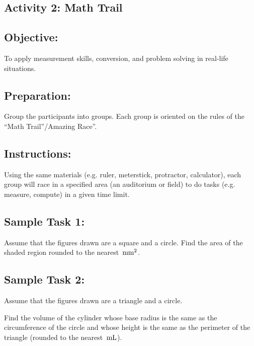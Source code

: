 \subsection*{Activity 2: Math Trail}
\subsection*{Objective:}
To apply measurement skills, conversion, and problem solving in real-life situations.
\subsection*{Preparation:}
Group the participants into groups. Each group is oriented on the rules of the “Math Trail”/Amazing Race”.
\subsection*{Instructions:}
Using the same materials (e.g. ruler, meterstick, protractor, calculator), each group will race
in a specified area (an auditorium or field) to do tasks (e.g. measure, compute) in a given
time limit.
\subsection*{Sample Task 1:}
Assume that the figures drawn are a square and a circle.
Find the area of the shaded region rounded to the nearest $\,\mathrm{mm}^2$.
\begin{figure}[!h]
\centering
{}
\end{figure}

\subsection*{Sample Task 2:}

Assume that the figures drawn are a triangle and a circle.

Find the volume of the cylinder whose base radius is the same as
the circumference of the circle and whose height is the same as the
perimeter of the triangle (rounded to the nearest $\,\mathrm{mL}$).\\

\begin{figure}[!h]
\centering
{}
\end{figure}
